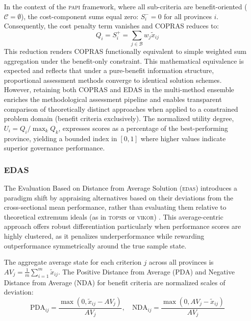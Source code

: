 \documentclass[12pt,a4paper]{article}
\newcommand{\PAPI}{\textsc{papi}\xspace}
\newcommand{\TOPSIS}{\textsc{topsis}\xspace}
\newcommand{\VIKOR}{\textsc{vikor}\xspace}
\newcommand{\EDAS}{\textsc{edas}\xspace}
\begin{document}
In the context of the \PAPI framework, where all sub-criteria are benefit-oriented (\( \mathcal{C} = \emptyset \)), the cost-component sums equal zero: \( S_i^- = 0 \) for all provinces \( i \). Consequently, the cost penalty term vanishes and COPRAS reduces to:
\begin{equation}
    Q_i = S_i^+ = \sum_{j \in \mathcal{B}} w_j \tilde{x}_{ij}
\end{equation}
This reduction renders COPRAS functionally equivalent to simple weighted sum aggregation under the benefit-only constraint. This mathematical equivalence is expected and reflects that under a pure-benefit information structure, proportional assessment methods converge to identical solution schemes. However, retaining both COPRAS and EDAS in the multi-method ensemble enriches the methodological assessment pipeline and enables transparent comparison of theoretically distinct approaches when applied to a constrained problem domain (benefit criteria exclusively). The normalized utility degree, \( U_i = Q_i / \max_k Q_k \), expresses scores as a percentage of the best-performing province, yielding a bounded index in \([0, 1]\) where higher values indicate superior governance performance.

\subsubsection{EDAS}
\label{subsubsec:edas}
The Evaluation Based on Distance from Average Solution (\EDAS) introduces a paradigm shift by appraising alternatives based on their deviations from the cross-sectional mean performance, rather than evaluating them relative to theoretical extremum ideals (as in \TOPSIS or \VIKOR) \citep{Keshavarz2015}. This average-centric approach offers robust differentiation particularly when performance scores are highly clustered, as it penalizes underperformance while rewarding outperformance symmetrically around the true sample state.

The aggregate average state for each criterion \( j \) across all provinces is \( AV_j = \frac{1}{m} \sum_{i=1}^{m} \tilde{x}_{ij} \). The Positive Distance from Average (\( \text{PDA} \)) and Negative Distance from Average (\( \text{NDA} \)) for benefit criteria are normalized scales of deviation:
\begin{equation}
    \text{PDA}_{ij} = \frac{\max(0, \tilde{x}_{ij} - AV_j)}{AV_j}, \quad 
    \text{NDA}_{ij} = \frac{\max(0, AV_j - \tilde{x}_{ij})}{AV_j}
\end{equation}
\end{document}
